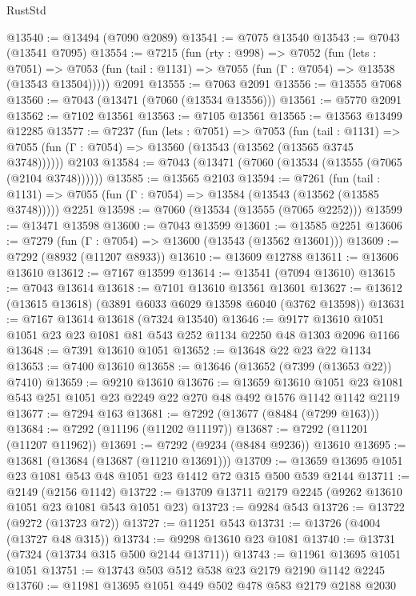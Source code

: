 \begin{lexlean}{RustStd}
\begin{coremodule}
@13540 := @13494 (@7090 @2089)
@13541 := @7075 @13540
@13543 := @7043 (@13541 @7095)
@13554 := @7215
    (fun (rty : @998) =>
    @7052
      (fun (lets : @7051) =>
      @7053 (fun (tail : @1131) => @7055 (fun (Γ : @7054) => @13538 (@13543 @13504)))))
    @2091
@13555 := @7063 @2091
@13556 := @13555 @7068
@13560 := @7043 (@13471 (@7060 (@13534 @13556)))
@13561 := @5770 @2091
@13562 := @7102 @13561
@13563 := @7105 @13561
@13565 := @13563 @13499 @12285
@13577 := @7237
    (fun (lets : @7051) =>
    @7053
      (fun (tail : @1131) =>
      @7055 (fun (Γ : @7054) => @13560 (@13543 (@13562 (@13565 @3745 @3748))))))
    @2103
@13584 := @7043 (@13471 (@7060 (@13534 (@13555 (@7065 (@2104 @3748))))))
@13585 := @13565 @2103
@13594 := @7261
    (fun (tail : @1131) => @7055 (fun (Γ : @7054) => @13584 (@13543 (@13562 (@13585 @3748)))))
    @2251
@13598 := @7060 (@13534 (@13555 (@7065 @2252)))
@13599 := @13471 @13598
@13600 := @7043 @13599
@13601 := @13585 @2251
@13606 := @7279 (fun (Γ : @7054) => @13600 (@13543 (@13562 @13601)))
@13609 := @7292 (@8932 (@11207 @8933))
@13610 := @13609 @12788
@13611 := @13606 @13610
@13612 := @7167 @13599
@13614 := @13541 (@7094 @13610)
@13615 := @7043 @13614
@13618 := @7101 @13610 @13561 @13601
@13627 := @13612 (@13615 @13618) (@3891 @6033 @6029 @13598 @6040 (@3762 @13598))
@13631 := @7167 @13614 @13618 (@7324 @13540)
@13646 := @9177 @13610 @1051 @1051 @23 @23 @1081 @81 @543 @252 @1134 @2250 @48 @1303 @2096 @1166
@13648 := @7391 @13610 @1051
@13652 := @13648 @22 @23 @22 @1134
@13653 := @7400 @13610
@13658 := @13646 (@13652 (@7399 (@13653 @22)) @7410)
@13659 := @9210 @13610
@13676 := @13659
    @13610
    @1051
    @23
    @1081
    @543
    @251
    @1051
    @23
    @2249
    @22
    @270
    @48
    @492
    @1576
    @1142
    @1142
    @2119
@13677 := @7294 @163
@13681 := @7292 (@13677 (@8484 (@7299 @163)))
@13684 := @7292 (@11196 (@11202 @11197))
@13687 := @7292 (@11201 (@11207 @11962))
@13691 := @7292 (@9234 (@8484 @9236)) @13610
@13695 := @13681 (@13684 (@13687 (@11210 @13691)))
@13709 := @13659 @13695 @1051 @23 @1081 @543 @48 @1051 @23 @1412 @72 @315 @500 @539 @2144
@13711 := @2149 (@2156 @1142)
@13722 := @13709 @13711 @2179 @2245 (@9262 @13610 @1051 @23 @1081 @543 @1051 @23)
@13723 := @9284 @543
@13726 := @13722 (@9272 (@13723 @72))
@13727 := @11251 @543
@13731 := @13726 (@4004 (@13727 @48 @315))
@13734 := @9298 @13610 @23 @1081
@13740 := @13731 (@7324 (@13734 @315 @500 @2144 @13711))
@13743 := @11961 @13695 @1051 @1051
@13751 := @13743 @503 @512 @538 @23 @2179 @2190 @1142 @2245
@13760 := @11981 @13695 @1051 @449 @502 @478 @583 @2179 @2188 @2030

\end{coremodule}
\end{lexlean}

